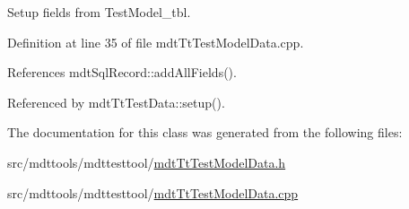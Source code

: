 Setup fields from Test\-Model\-\_\-tbl. 



Definition at line 35 of file mdt\-Tt\-Test\-Model\-Data.\-cpp.



References mdt\-Sql\-Record\-::add\-All\-Fields().



Referenced by mdt\-Tt\-Test\-Data\-::setup().



The documentation for this class was generated from the following files\-:\begin{DoxyCompactItemize}
\item 
src/mdttools/mdttesttool/\hyperlink{mdt_tt_test_model_data_8h}{mdt\-Tt\-Test\-Model\-Data.\-h}\item 
src/mdttools/mdttesttool/\hyperlink{mdt_tt_test_model_data_8cpp}{mdt\-Tt\-Test\-Model\-Data.\-cpp}\end{DoxyCompactItemize}
